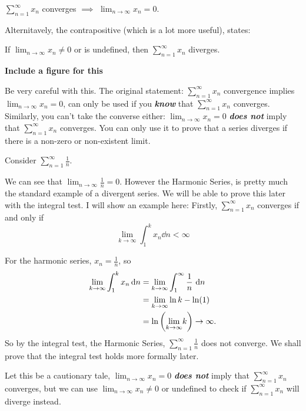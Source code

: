 \documentclass[12pt]{article}
\theoremstyle{definition}
\newcommand{\xseries}{\sum_{n = 1}^{\infty}x_{n}}
\newcommand{\nlim}{\lim_{n\rightarrow\infty}}
\begin{document}
            \begin{prop}
                $\xseries$ converges $\implies$ $\nlim x_{n} = 0$.

                Alternitavely, the contrapositive (which is a lot more useful), states:

                If $\nlim x_{n} \neq 0$ or is undefined, then $\xseries$ diverges.
            \end{prop}
            \textbf{Include a figure for this}
            \begin{note}
                Be very careful with this. The original statement: $\xseries$ convergence implies $\nlim x_{n} = 0$, can only be used if you \textbf{\emph{know}} that $\xseries$ converges. 
                Similarly, you can't take the converse either: $\nlim x_{n} = 0$ \textbf{\emph{ does not}} imply that $\xseries$ converges. You can only use it to prove that a series diverges if there is a non-zero or non-existent limit.
            \end{note}
            \begin{eg}
                Consider $\sum_{n = 1}^{\infty}\frac{1}{n}$.

                We can see that $\nlim \frac{1}{n} = 0$. However the Harmonic Series, is pretty much the standard example of a divergent series. We will be able to prove this later with the integral test. I will show an example here:
                Firstly, $\sum_{n = 1}^{\infty}x_{n}$ converges if and only if 
                \[
                    \lim_{k\rightarrow\infty}\int_{1}^{k}x_{n}\dd{n} < \infty
                \]

                For the harmonic series, $x_{n} = \frac{1}{n}$, so
                \begin{align*}
                    \lim_{k \rightarrow \infty}\int_{1}^{k}x_{n}\!\mathop{}\mathrm{d}{n} &= \lim_{k \rightarrow \infty}\int_{1}^{\infty}\frac{1}{n}\mathop{}\mathrm{d}{n} \\
                                                                            &= \lim_{k \rightarrow \infty}\ln{k} - \ln(1) \\
                                                                            &= \ln\left({\lim_{k \rightarrow \infty}}k\right) \rightarrow \infty.
                \end{align*}
                So by the integral test, the Harmonic Series, $\sum_{n = 1}^{\infty}\frac{1}{n}$ does not converge. We shall prove that the integral test holds more formally later.

                Let this be a cautionary tale, $\nlim x_{n} = 0$ \textbf{\emph{does not}} imply that $\xseries$ converges, but we can use $\nlim x_{n} \neq 0$ or undefined to check if $\xseries$ will diverge instead.
            \end{eg}
\end{document}
